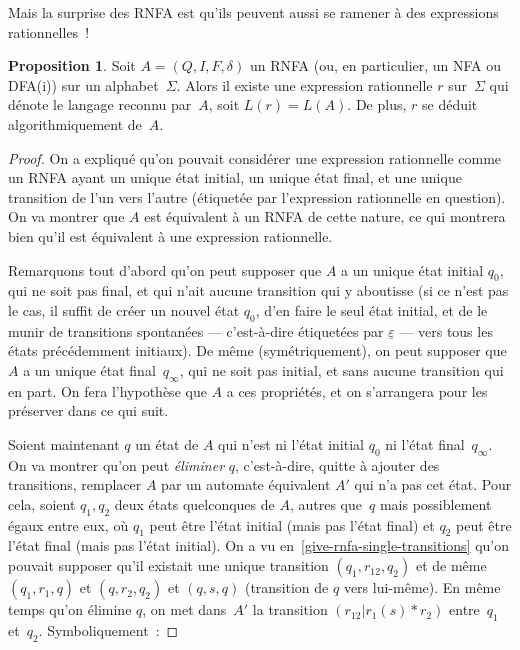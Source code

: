 \documentclass[12pt,a4paper]{article}
\theoremstyle{definition}
\newtheorem{prop}[comcnt]{Proposition}
\begin{document}
\medskip

Mais la surprise des RNFA est qu'ils peuvent aussi se ramener à des
expressions rationnelles !

\begin{prop}\label{recognizable-languages-are-rational}
Soit $A = (Q,I,F,\delta)$ un RNFA (ou, en particulier, un NFA ou
DFA(i)) sur un alphabet $\Sigma$.  Alors il existe une expression
rationnelle $r$ sur $\Sigma$ qui dénote le langage reconnu par $A$,
soit $L(r) = L(A)$.  De plus, $r$ se déduit algorithmiquement de $A$.
\end{prop}
\begin{proof}
On a expliqué qu'on pouvait considérer une expression rationnelle
comme un RNFA ayant un unique état initial, un unique état final, et
une unique transition de l'un vers l'autre (étiquetée par l'expression
rationnelle en question).  On va montrer que $A$ est équivalent à un
RNFA de cette nature, ce qui montrera bien qu'il est équivalent à une
expression rationnelle.

Remarquons tout d'abord qu'on peut supposer que $A$ a un unique état
initial $q_0$, qui ne soit pas final, et qui n'ait aucune transition
qui y aboutisse (si ce n'est pas le cas, il suffit de créer un nouvel
état $q_0$, d'en faire le seul état initial, et de le munir de
transitions spontanées — c'est-à-dire étiquetées par
$\underline{\varepsilon}$ — vers tous les états précédemment
initiaux).  De même (symétriquement), on peut supposer que $A$ a un
unique état final $q_\infty$, qui ne soit pas initial, et sans aucune
transition qui en part.  On fera l'hypothèse que $A$ a ces propriétés,
et on s'arrangera pour les préserver dans ce qui suit.

Soient maintenant $q$ un état de $A$ qui n'est ni l'état initial $q_0$
ni l'état final $q_\infty$.  On va montrer qu'on peut \emph{éliminer}
$q$, c'est-à-dire, quitte à ajouter des transitions, remplacer $A$ par
un automate équivalent $A'$ qui n'a pas cet état.  Pour cela, soient
$q_1,q_2$ deux états quelconques de $A$, autres que $q$ mais
possiblement égaux entre eux, où $q_1$ peut être l'état initial (mais
pas l'état final) et $q_2$ peut être l'état final (mais pas l'état
initial).  On a vu en \ref{give-rnfa-single-transitions} qu'on pouvait
supposer qu'il existait une unique transition $(q_1,r_{12},q_2)$ et de
même $(q_1,r_1,q)$ et $(q,r_2,q_2)$ et $(q,s,q)$ (transition de $q$
vers lui-même).  En même temps qu'on élimine $q$, on met dans $A'$ la
transition $(r_{12}|r_1(s){*}r_2)$ entre $q_1$ et $q_2$.
Symboliquement :


\end{proof}
\end{document}

